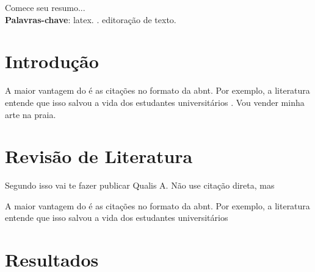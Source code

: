 \documentclass[
	article,
	12pt,
	oneside,
	a4paper,
	english,
	brazil
	]{abntex2}
\begin{document}
\maketitle



\begin{resumoumacoluna}
 Comece seu resumo... \\
 
 \textbf{Palavras-chave}: latex. \abnTeX. editoração de texto.
\end{resumoumacoluna}

\textual
\section{Introdução}

A maior vantagem do \abnTeX é as citações no formato da abnt. Por exemplo, a literatura entende que isso salvou a vida dos estudantes universitários \cite{Abreu1999}. Vou vender minha arte na praia.

\section{Revisão de Literatura}
Segundo  isso vai te fazer publicar Qualis A. Não use citação direta, mas

\begin{citacao}
A maior vantagem do \abnTeX é as citações no formato da abnt. Por exemplo, a literatura entende que isso salvou a vida dos estudantes universitários \cite{Abreu1999}
\end{citacao}


\section{Resultados}


\end{document}

